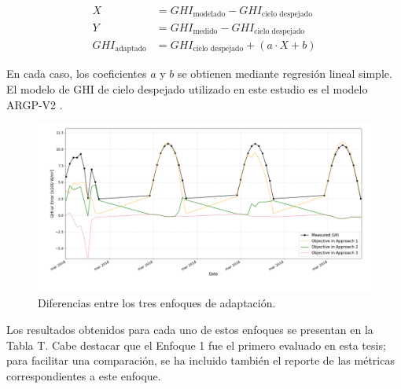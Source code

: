 \begin{align}
X &= GHI_{\text{modelado}} - GHI_{\text{cielo despejado}} \\
Y &= GHI_{\text{medido}} - GHI_{\text{cielo despejado}} \\
GHI_{\text{adaptado}} &= GHI_{\text{cielo despejado}} + (a \cdot X + b)
\label{eq:approach3}
\end{align}

En cada caso, los coeficientes $a$ y $b$ se obtienen mediante regresión lineal simple. El modelo de GHI de cielo despejado utilizado en este estudio es el modelo ARGP-V2 \cite{Ledesma2023a}.

\begin{figure}[ht!]
\centering
\includegraphics[width=\textwidth]{figuras/approaches.png}
\caption{Diferencias entre los tres enfoques de adaptación.}
\label{fig:approaches}
\end{figure}



Los resultados obtenidos para cada uno de estos enfoques se presentan en la Tabla T. Cabe destacar que el Enfoque 1 fue el primero evaluado en esta tesis; para facilitar una comparación, se ha incluido también el reporte de las métricas correspondientes a este enfoque.


